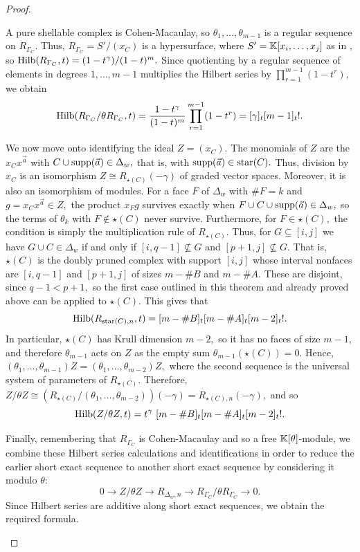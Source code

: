 \begin{proof}
\begin{enumerate}
        A pure shellable complex is Cohen-Macaulay, so $\theta_1,\ldots,\theta_{m-1}$ is a regular sequence on $R_{\Gamma_C}.$ 
        Thus, $R_{\Gamma_C} = S'/(x_C)$ is a hypersurface, where $S' = \mathbb{K}[x_i,\ldots,x_j]$ as in , so $\mathrm{Hilb}(R_{\Gamma_C},t) = (1-t^\gamma)/(1-t)^m.$ Since quotienting by a regular sequence of elements in degrees $1,\ldots, m - 1$ multiplies the Hilbert series by $\prod_{r = 1}^{m-1}(1-t^r),$ we obtain 
        \[
        \mathrm{Hilb}(R_{\Gamma_C}/\theta R_{\Gamma_C},t) = 
        \frac{1-t^\gamma}{(1-t)^m}
        \prod_{r = 1}^{m - 1}(1-t^r)
        = [\gamma]_t[m - 1]_t!.
        \]

        We now move onto identifying the ideal $Z = (x_C).$
        The monomials of $Z$ are the $x_C x^{\vec{a}}$ with $C\cup\mathrm{supp}(\vec{a})\in\Delta_w,$ that is, with $\mathrm{supp}(\vec{a})\in\mathrm{star}(C).$ 
        Thus, division by $x_C$ is an isomorphism $Z\cong R_{\star(C)}(-\gamma)$ of graded vector spaces. 
        Moreover, it is also an isomorphism of modules. 
        For a face $F$ of $\Delta_w$ with $\#F = k$ and $g = x_C x^{\vec{a}}\in Z,$ the product $x_Fg$ survives exactly when $F\cup C\cup\mathrm{supp}(\vec{a})\in\Delta_w,$ so the terms of $\theta_k$ with $F\not\in\star(C)$ never survive. 
        Furthermore, for $F\in\star(C),$ the condition is simply the multiplication rule of $R_{\star(C)}.$ 
        Thus, for $G\subseteq[i,j]$ we have $G\cup C\in\Delta_w$ if and only if $[i,q-1]\not\subseteq G$ and $[p+1,j]\not\subseteq G.$ 
        That is, $\star(C)$ is the doubly pruned complex with support $[i,j]$ whose interval nonfaces are $[i,q-1]$ and $[p+1,j]$ of sizes $m - \#B$ and $m - \#A.$
        These are disjoint, since $q - 1 < p + 1,$ so the first case outlined in this theorem and already proved above can be applied to $\star(C).$ 
        This gives that
        \[\mathrm{Hilb}(R_{\mathrm{star}(C),n},t) = [m-\#B]_t[m-\#A]_t[m-2]_t!.\]
        In particular, $\star(C)$ has Krull dimension $m - 2,$ so it has no faces of size $m - 1,$ and therefore $\theta_{m-1}$ acts on $Z$ as the empty sum $\theta_{m-1}(\star(C)) = 0.$ 
        Hence, $(\theta_1,\ldots,\theta_{m-1})Z = (\theta_1,\ldots,\theta_{m-2})Z,$ where the second sequence is the universal system of parameters of $R_{\star(C)}.$ 
        Therefore, $Z/\theta Z\cong (R_{\star(C)}/(\theta_1,\ldots,\theta_{m-2}))(-\gamma) = R_{\star(C),n}(-\gamma),$ and so
        \[
        \mathrm{Hilb}(Z/\theta Z,t) = t^\gamma~[m-\#B]_t[m-\#A]_t[m-2]_t!.
        \]

        Finally, remembering that $R_{\Gamma_C}$ is Cohen-Macaulay and so a free $\mathbb{K}[\theta]$-module, we 
        combine these Hilbert series calculations and identifications in order to reduce the earlier short exact sequence to another short exact sequence by considering it modulo $\theta:$
        \[
        0 \longrightarrow
        Z/\theta Z \longrightarrow
        R_{\Delta_w,n} \longrightarrow
        R_{\Gamma_C}/\theta R_{\Gamma_C} \longrightarrow
        0.
        \]
        Since Hilbert series are additive along short exact sequences, we obtain the required formula.


\end{enumerate}
\end{proof}
